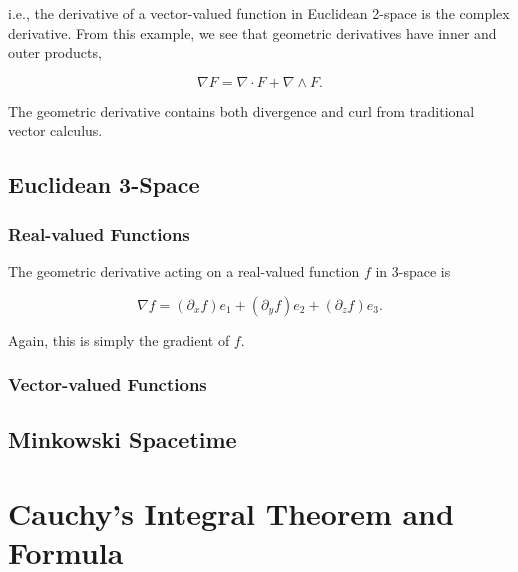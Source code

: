 	i.e., the derivative of a vector-valued function in Euclidean 2-space is the complex derivative. From this example, we see that geometric derivatives have inner and outer products,
	
	\[
	\nabla F = \nabla \cdot F + \nabla \wedge F.
	\]
	
	The geometric derivative contains both divergence and curl from traditional vector calculus.
	
	\subsection{Euclidean 3-Space}
	
	\subsubsection{Real-valued Functions}
	
	The geometric derivative acting on a real-valued function $f$ in 3-space is
	
	\[
	\nabla f = \left( \partial_x f\right) e_1  + \left( \partial_y f\right) e_2 + \left( \partial_z f\right) e_3.
	\]
	
	Again, this is simply the gradient of $f$.
	
	\subsubsection{Vector-valued Functions}
	
	\subsection{Minkowski Spacetime}
	
	\section{Cauchy's Integral Theorem and Formula}